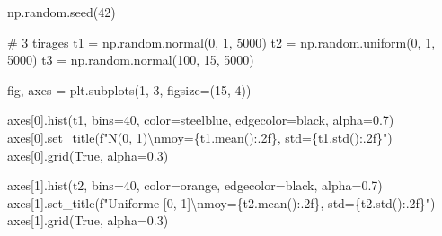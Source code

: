 \documentclass[
  french,
  11pt,
  a4paper,
]{scrbook}
\newenvironment{Shaded}{}{}
\newcommand{\CharTok}[1]{\textcolor[rgb]{0.01,0.18,0.38}{#1}}
\newcommand{\CommentTok}[1]{\textcolor[rgb]{0.42,0.45,0.49}{#1}}
\newcommand{\DecValTok}[1]{\textcolor[rgb]{0.00,0.36,0.77}{#1}}
\newcommand{\FloatTok}[1]{\textcolor[rgb]{0.00,0.36,0.77}{#1}}
\newcommand{\NormalTok}[1]{\textcolor[rgb]{0.14,0.16,0.18}{#1}}
\newcommand{\OperatorTok}[1]{\textcolor[rgb]{0.14,0.16,0.18}{#1}}
\newcommand{\SpecialCharTok}[1]{\textcolor[rgb]{0.00,0.36,0.77}{#1}}
\newcommand{\SpecialStringTok}[1]{\textcolor[rgb]{0.01,0.18,0.38}{#1}}
\newcommand{\StringTok}[1]{\textcolor[rgb]{0.01,0.18,0.38}{#1}}
\newcommand{\VariableTok}[1]{\textcolor[rgb]{0.89,0.38,0.04}{#1}}
\begin{document}
\begin{tcolorbox}[enhanced jigsaw, arc=.35mm, bottomrule=.15mm, bottomtitle=1mm, breakable, colback=white, colbacktitle=quarto-callout-tip-color!10!white, colframe=quarto-callout-tip-color-frame, coltitle=black, left=2mm, leftrule=.75mm, opacityback=0, opacitybacktitle=0.6, rightrule=.15mm, title=\textcolor{quarto-callout-tip-color}{\faLightbulb}\hspace{0.5em}{✅ Voir la correction}, titlerule=0mm, toprule=.15mm, toptitle=1mm]

\begin{Shaded}
\begin{Highlighting}[]
\NormalTok{np.random.seed(}\DecValTok{42}\NormalTok{)}

\CommentTok{\# 3 tirages}
\NormalTok{t1 }\OperatorTok{=}\NormalTok{ np.random.normal(}\DecValTok{0}\NormalTok{, }\DecValTok{1}\NormalTok{, }\DecValTok{5000}\NormalTok{)}
\NormalTok{t2 }\OperatorTok{=}\NormalTok{ np.random.uniform(}\DecValTok{0}\NormalTok{, }\DecValTok{1}\NormalTok{, }\DecValTok{5000}\NormalTok{)}
\NormalTok{t3 }\OperatorTok{=}\NormalTok{ np.random.normal(}\DecValTok{100}\NormalTok{, }\DecValTok{15}\NormalTok{, }\DecValTok{5000}\NormalTok{)}

\NormalTok{fig, axes }\OperatorTok{=}\NormalTok{ plt.subplots(}\DecValTok{1}\NormalTok{, }\DecValTok{3}\NormalTok{, figsize}\OperatorTok{=}\NormalTok{(}\DecValTok{15}\NormalTok{, }\DecValTok{4}\NormalTok{))}

\NormalTok{axes[}\DecValTok{0}\NormalTok{].hist(t1, bins}\OperatorTok{=}\DecValTok{40}\NormalTok{, color}\OperatorTok{=}\StringTok{\textquotesingle{}steelblue\textquotesingle{}}\NormalTok{, edgecolor}\OperatorTok{=}\StringTok{\textquotesingle{}black\textquotesingle{}}\NormalTok{, alpha}\OperatorTok{=}\FloatTok{0.7}\NormalTok{)}
\NormalTok{axes[}\DecValTok{0}\NormalTok{].set\_title(}\SpecialStringTok{f"N(0, 1)}\CharTok{\textbackslash{}n}\SpecialStringTok{moy=}\SpecialCharTok{\{}\NormalTok{t1}\SpecialCharTok{.}\NormalTok{mean()}\SpecialCharTok{:.2f\}}\SpecialStringTok{, std=}\SpecialCharTok{\{}\NormalTok{t1}\SpecialCharTok{.}\NormalTok{std()}\SpecialCharTok{:.2f\}}\SpecialStringTok{"}\NormalTok{)}
\NormalTok{axes[}\DecValTok{0}\NormalTok{].grid(}\VariableTok{True}\NormalTok{, alpha}\OperatorTok{=}\FloatTok{0.3}\NormalTok{)}

\NormalTok{axes[}\DecValTok{1}\NormalTok{].hist(t2, bins}\OperatorTok{=}\DecValTok{40}\NormalTok{, color}\OperatorTok{=}\StringTok{\textquotesingle{}orange\textquotesingle{}}\NormalTok{, edgecolor}\OperatorTok{=}\StringTok{\textquotesingle{}black\textquotesingle{}}\NormalTok{, alpha}\OperatorTok{=}\FloatTok{0.7}\NormalTok{)}
\NormalTok{axes[}\DecValTok{1}\NormalTok{].set\_title(}\SpecialStringTok{f"Uniforme [0, 1]}\CharTok{\textbackslash{}n}\SpecialStringTok{moy=}\SpecialCharTok{\{}\NormalTok{t2}\SpecialCharTok{.}\NormalTok{mean()}\SpecialCharTok{:.2f\}}\SpecialStringTok{, std=}\SpecialCharTok{\{}\NormalTok{t2}\SpecialCharTok{.}\NormalTok{std()}\SpecialCharTok{:.2f\}}\SpecialStringTok{"}\NormalTok{)}
\NormalTok{axes[}\DecValTok{1}\NormalTok{].grid(}\VariableTok{True}\NormalTok{, alpha}\OperatorTok{=}\FloatTok{0.3}\NormalTok{)}


\end{Highlighting}
\end{Shaded}
\end{tcolorbox}
\end{document}
